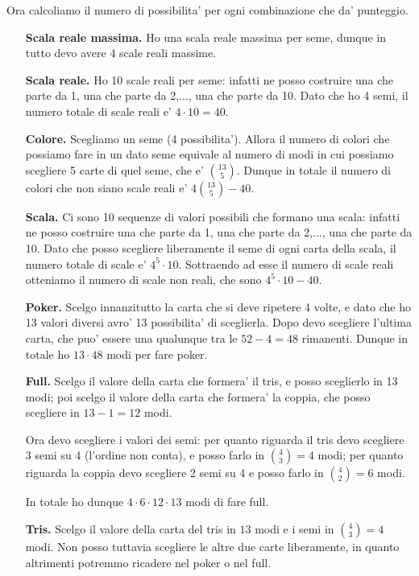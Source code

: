 Ora calcoliamo il numero di possibilita' per ogni combinazione che da' punteggio.
\begin{itemize}
    \item[\textbf{Scala reale massima.}] Ho una scala reale massima per seme, dunque in tutto devo avere 4 scale reali massime.
    \item[\textbf{Scala reale.}] Ho 10 scale reali per seme: infatti ne posso costruire una che parte da 1, una che parte da 2,..., una che parte da 10. Dato che ho 4 semi, il numero totale di scale reali e' $4 \cdot 10 = 40$. 
    \item[\textbf{Colore.}] Scegliamo un seme (4 possibilita'). Allora il numero di colori che possiamo fare in un dato seme equivale al numero di modi in cui possiamo scegliere 5 carte di quel seme, che e' $\binom{13}{5}$. Dunque in totale il numero di colori che non siano scale reali e' $4\binom{13}{5}-40$.
    \item[\textbf{Scala.}] Ci sono 10 sequenze di valori possibili che formano una scala: infatti ne posso costruire una che parte da 1, una che parte da 2,..., una che parte da 10. Dato che posso scegliere liberamente il seme di ogni carta della scala, il numero totale di scale e' $4^5 \cdot 10$. Sottraendo ad esse il numero di scale reali otteniamo il numero di scale non reali, che sono $4^5 \cdot 10 - 40$.
    \item[\textbf{Poker.}] Scelgo innanzitutto la carta che si deve ripetere 4 volte, e dato che ho 13 valori diversi avro' 13 possibilita' di sceglierla. Dopo devo scegliere l'ultima carta, che puo' essere una qualunque tra le $52 - 4 = 48$ rimanenti. Dunque in totale ho $13\cdot 48$ modi per fare poker.
    \item[\textbf{Full.}] Scelgo il valore della carta che formera' il tris, e posso sceglierlo in 13 modi; poi scelgo il valore della carta che formera' la coppia, che posso scegliere in $13-1 = 12$ modi. 
    
    Ora devo scegliere i valori dei semi: per quanto riguarda il tris devo scegliere 3 semi su 4 (l'ordine non conta), e posso farlo in $\binom{4}{3} = 4$ modi; per quanto riguarda la coppia devo scegliere 2 semi su 4 e posso farlo in $\binom{4}{2} = 6$ modi. 
    
    In totale ho dunque $4\cdot 6\cdot 12 \cdot 13$ modi di fare full. 
    \item[\textbf{Tris.}] Scelgo il valore della carta del tris in $13$ modi e i semi in $\binom{4}{3} = 4$ modi. Non posso tuttavia scegliere le altre due carte liberamente, in quanto altrimenti potremmo ricadere nel poker o nel full. 
    

\end{itemize}
